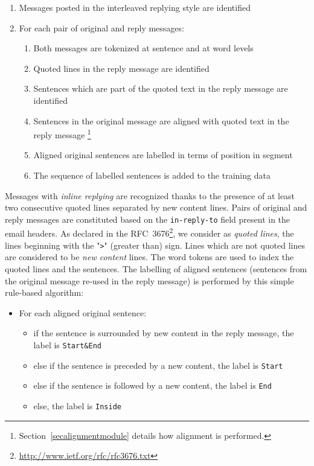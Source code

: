 \begin{enumerate}[itemsep=0mm]
	\item Messages posted in the interleaved replying style are identified
	\item For each pair of original and reply messages:
	\begin{enumerate}
		\item Both messages are tokenized at sentence and at word levels
		\item Quoted lines in the reply message are identified
		\item Sentences which are part of the quoted text in the reply message are identified 
		\item Sentences in the original message are aligned with  quoted text in the reply message \footnote{Section~\ref{secalignmentmodule} details how alignment is performed.}
		\item Aligned original sentences are labelled in terms of position in segment 
		\item The sequence of labelled sentences is added to the training data 
	\end{enumerate}
\end{enumerate}

Messages with \textit{inline replying} are recognized thanks to the presence of at least two consecutive quoted lines separated by new content lines.
% 
Pairs of original and reply messages are constituted based on the \texttt{\footnotesize in-reply-to} field present in the email headers.
% 
As declared in the RFC~3676\footnote{\url{http://www.ietf.org/rfc/rfc3676.txt}}, we consider as \textit{quoted lines}, the lines beginning with the "\texttt{>}" (greater than) sign.
% 
Lines which are not quoted lines are considered to be \textit{new content} lines.
% 
The word tokens are used to index the quoted lines and the sentences. 
%
The labelling of aligned sentences (sentences from the original message re-used in the reply message) is performed by this simple rule-based algorithm:

\begin{itemize}
	\item[] For each aligned original sentence: \vspace{-0.2cm}
	\begin{itemize}
		\item[] if the sentence is surrounded by new content in the reply message, the label is \texttt{\footnotesize Start\&End}
		\item[] else if the sentence is preceded by a new content, the label is \texttt{\footnotesize Start}
		\item[] \indent else if the sentence is followed by a new content, the label is \texttt{\footnotesize End}
		\item[] else, the label is \texttt{\footnotesize Inside}
	\end{itemize}
\end{itemize}

